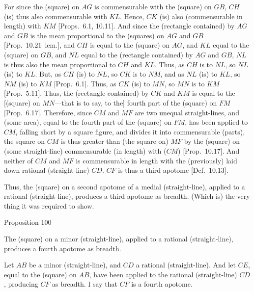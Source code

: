 For since the (square) on $AG$ is commensurable with the (square) on 
$GB$, $CH$ (is) thus also commensurable with $KL$. Hence,
$CK$ (is) also  (commensurable in length) with $KM$ [Props.~6.1, 10.11]. 
And since the (rectangle contained) by $AG$ and $GB$ is the mean
proportional to the (squares) on $AG$ and $GB$ [Prop.~10.21~lem.], and $CH$
is equal to the (square) on $AG$, and $KL$ equal to the (square) on  $GB$,
and $NL$ equal to the (rectangle contained) by $AG$ and $GB$, $NL$ is
thus also the mean proportional to $CH$ and $KL$. Thus, as $CH$ is to
$NL$, so $NL$ (is) to $KL$. But, as $CH$ (is) to $NL$, so $CK$
is to $NM$, and as $NL$ (is) to $KL$, so $NM$ (is) to $KM$
[Prop.~6.1]. Thus, as $CK$ (is) to $MN$, so $MN$
is to $KM$ [Prop.~5.11]. Thus, the (rectangle contained) by $CK$ and $KM$
is equal to the [(square) on $MN$---that is to say, to the] fourth part of the
(square) on $FM$ [Prop.~6.17]. Therefore,
since $CM$ and $MF$ are two unequal straight-lines, and
(some area), equal to the fourth part of the (square) on  $FM$, has been
applied to $CM$, falling short by a square figure, and divides it into
commensurable (parts),  the square on $CM$ is thus greater than (the square on) $MF$ by the (square) on (some straight-line) commensurable
(in length) with ($CM$) [Prop.~10.17]. 
And neither of $CM$ and $MF$ is commensurable in length with the
(previously) laid down rational (straight-line) $CD$. $CF$ is thus a
third apotome [Def.~10.13].

Thus, the (square) on a second apotome of a medial
(straight-line), applied to a rational (straight-line), produces  a
third apotome as breadth. (Which is) the very thing it was required to show.


\begin{center}
{\large Proposition 100}
\end{center}

The (square) on a minor
(straight-line), applied to a rational (straight-line), produces  a
fourth apotome as breadth.

\epsfysize=1.6in
\centerline{}

Let $AB$ be a minor (straight-line), and $CD$ a rational (straight-line).
And let $CE$, equal to the (square) on $AB$, have been applied to the rational (straight-line) $CD$, producing $CF$ as breadth. I say that
$CF$ is a fourth apotome.

